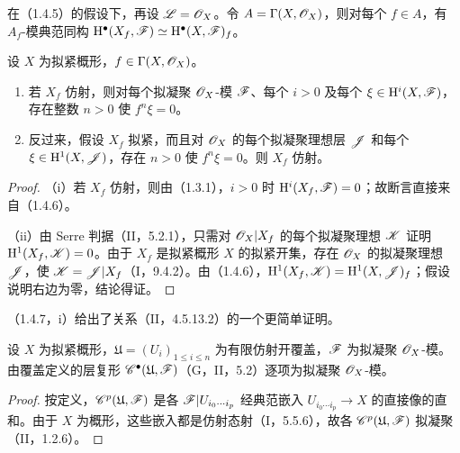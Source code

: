 在（1.4.5）的假设下，再设 $\mathscr L=\mathscr O_X$。令 $A=\Gamma(X,\mathscr O_X)$，则对每个 $f\in A$，有 $A_f$-模典范同构 $\mathrm H^\bullet(X_f,\mathscr F)\simeq\mathrm H^\bullet(X,\mathscr F)_f$。

设 $X$ 为拟紧概形，$f\in\Gamma(X,\mathscr O_X)$。
\begin{enumerate}[label=(\roman*)]
\item 若 $X_f$ 仿射，则对每个拟凝聚 $\mathscr O_X$-模 $\mathscr F$、每个 $i>0$ 及每个 $\xi\in\mathrm H^i(X,\mathscr F)$，存在整数 $n>0$ 使 $f^n\xi=0$。
\item 反过来，假设 $X_f$ 拟紧，而且对 $\mathscr O_X$ 的每个拟凝聚理想层 $\mathscr J$ 和每个 $\xi\in\mathrm H^1(X,\mathscr J)$，存在 $n>0$ 使 $f^n\xi=0$。则 $X_f$ 仿射。
\end{enumerate}
\begin{proof}
（i）若 $X_f$ 仿射，则由（1.3.1），$i>0$ 时 $\mathrm H^i(X_f,\mathscr F)=0$；故断言直接来自（1.4.6）。

（ii）由 Serre 判据（II，5.2.1），只需对 $\mathscr O_X|X_f$ 的每个拟凝聚理想 $\mathscr K$ 证明 $\mathrm H^1(X_f,\mathscr K)=0$。由于 $X_f$ 是拟紧概形 $X$ 的拟紧开集，存在 $\mathscr O_X$ 的拟凝聚理想 $\mathscr J$，使 $\mathscr K=\mathscr J|X_f$（I，9.4.2）。由（1.4.6），$\mathrm H^1(X_f,\mathscr K)=\mathrm H^1(X,\mathscr J)_f$；假设说明右边为零，结论得证。
\end{proof}

（1.4.7，i）给出了关系（II，4.5.13.2）的一个更简单证明。

设 $X$ 为拟紧概形，$\mathfrak U=(U_i)_{1\leq i\leq n}$ 为有限仿射开覆盖，$\mathscr F$ 为拟凝聚 $\mathscr O_X$-模。由覆盖定义的层复形 $\mathscr C^\bullet(\mathfrak U,\mathscr F)$（G，II，5.2）逐项为拟凝聚 $\mathscr O_X$-模。
\begin{proof}
按定义，$\mathscr C^p(\mathfrak U,\mathscr F)$ 是各 $\mathscr F|U_{i_0\cdots i_p}$ 经典范嵌入 $U_{i_0\cdots i_p}\to X$ 的直接像的直和。由于 $X$ 为概形，这些嵌入都是仿射态射（I，5.5.6），故各 $\mathscr C^p(\mathfrak U,\mathscr F)$ 拟凝聚（II，1.2.6）。
\end{proof}

